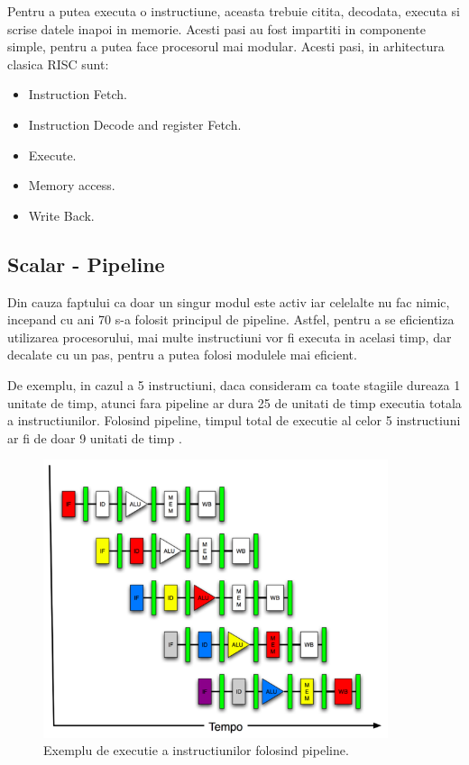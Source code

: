 Pentru a putea executa o instructiune, aceasta trebuie citita, decodata, executa si scrise datele
inapoi in memorie. Acesti pasi au fost impartiti in componente simple, pentru a putea face
procesorul mai modular. Acesti pasi, in arhitectura clasica RISC sunt:
\begin{itemize}

\item Instruction Fetch.
\item Instruction Decode and register Fetch.
\item Execute.
\item Memory access.
\item Write Back.

\end{itemize}

\subsection{Scalar - Pipeline}

Din cauza faptului ca doar un singur modul este activ iar celelalte nu fac nimic, incepand cu ani 70
s-a folosit principul de pipeline. Astfel, pentru a se eficientiza utilizarea procesorului, mai
multe instructiuni vor fi executa in acelasi timp, dar decalate cu un pas, pentru a putea folosi
modulele mai eficient.

De exemplu, in cazul a 5 instructiuni, daca consideram ca toate stagiile dureaza 1 unitate de timp,
atunci fara pipeline ar dura 25 de unitati de timp executia totala a instructiunilor. Folosind
pipeline, timpul total de executie al celor 5 instructiuni ar fi de doar 9 unitati de timp
\cite{johnson1991superscalar}.

\begin{figure}[ht] \centering
\includegraphics[width=0.9\textwidth]{img/pipeline.png}
\caption{Exemplu de executie a instructiunilor folosind pipeline.} \end{figure}

